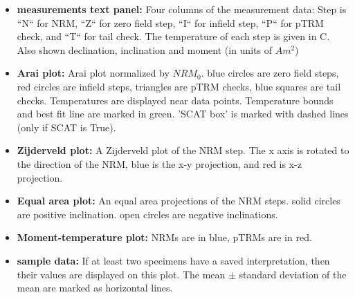 \documentclass[11pt]{book}
\begin{document}
{{\begin{itemize}
\item {\bf measurements text panel:} Four columns of the measurement data: Step is ``N`` for NRM, ``Z`` for zero field step, ``I`` for infield step, ``P`` for pTRM check, and ``T`` for tail check. The temperature of each step is given in C. Also shown  declination, inclination and moment (in units of $Am^2$)
\item {\bf Arai plot:}  Arai plot normalized by $NRM_0$. blue circles are zero field steps, red circles are infield steps, triangles are pTRM checks, blue squares are tail checks. Temperatures are displayed near data points. Temperature bounds and best fit line are marked in green. 'SCAT box' is marked with dashed lines (only if SCAT is True).
\item {\bf Zijderveld plot:}  A Zijderveld plot of the NRM step.  The x axis is rotated to the direction of the NRM, blue is the x-y  projection, and red is x-z projection.
\item {\bf Equal area plot:}  An equal area projections  of the NRM steps. solid circles are positive inclination. open circles are negative inclinations.
\item {\bf Moment-temperature plot:}  NRMs are in blue, pTRMs are in red.
\item {\bf sample data:}  If at least two specimens have a saved interpretation, then their values are displayed on this plot. The mean $\pm$ standard deviation of the mean are marked as  horizontal lines.
\end{itemize}

}}
\end{document}
